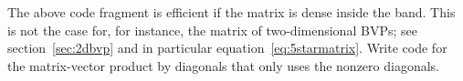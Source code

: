   The above code fragment is efficient if the matrix is dense inside
  the band. This is not the case for, for instance, the matrix of
  two-dimensional \acp{BVP}; see section~\ref{sec:2dbvp} and in
  particular equation~\eqref{eq:5starmatrix}. Write code for the
  matrix-vector product by diagonals that only
  uses the nonzero diagonals.
